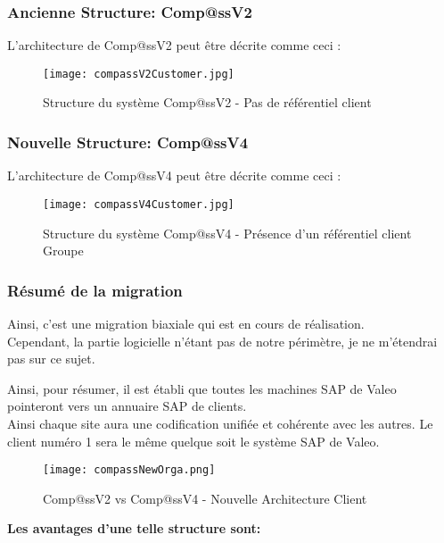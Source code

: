 \subsubsection{Ancienne Structure: Comp@ssV2}

L'architecture de Comp@ssV2 peut être décrite comme ceci : 

 \begin{figure}[H]
    \centering
    \texttt{[image: compassV2Customer.jpg]}
	\caption{Structure du système Comp@ssV2 - Pas de référentiel client}\label{image.compassV2Customer} 
\end{figure}

\subsubsection{Nouvelle Structure: Comp@ssV4}

L'architecture de Comp@ssV4 peut être décrite comme ceci : 

 \begin{figure}[H]
    \centering
    \texttt{[image: compassV4Customer.jpg]}
	\caption{Structure du système Comp@ssV4 - Présence d'un référentiel client Groupe}\label{image.compassV4Customer} 
\end{figure}

\clearpage

\subsubsection{Résumé de la migration}

Ainsi, c'est une migration biaxiale qui est en cours de réalisation.\\
Cependant, la partie logicielle n'étant pas de notre périmètre, je ne m'étendrai pas sur ce sujet.

Ainsi, pour résumer, il est établi que toutes les machines SAP de Valeo pointeront vers un annuaire SAP de clients.\\ Ainsi chaque site aura une codification unifiée et cohérente avec les autres.
Le client numéro 1 sera le même quelque soit le système SAP de Valeo.

 \begin{figure}[H]
    \centering
    \texttt{[image: compassNewOrga.png]}
	\caption{Comp@ssV2 vs Comp@ssV4 - Nouvelle Architecture Client}\label{image.compassNewOrga} 
\end{figure}
\textbf{
Les avantages d'une telle structure sont:}

